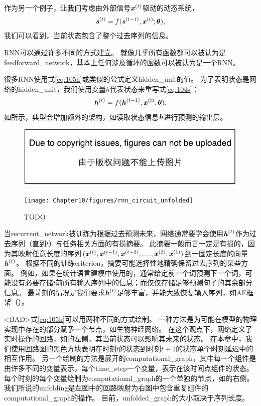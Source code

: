 
作为另一个例子，让我们考虑由外部信号$\boldsymbol{\mathit{x}}^{(t)}$驱动的动态系统，
\begin{align}
 \label{eq:104s}
 \boldsymbol{\mathit{s}}^{(t)} = f(\boldsymbol{\mathit{s}}^{(t-1)}, \boldsymbol{\mathit{x}}^{(t)} ; \boldsymbol{\theta}),
\end{align}
我们可以看到，当前状态包含了整个过去序列的信息。

\gls{RNN}可以通过许多不同的方式建立。
就像几乎所有函数都可以被认为是\gls{feedforward_network}，基本上任何涉及循环的函数可以被认为是一个\gls{RNN}。

很多\gls{RNN}使用式\eqref{eq:105h}或类似的公式定义\gls{hidden_unit}的值。
为了表明状态是网络的\gls{hidden_unit}，我们使用变量$h$代表状态来重写式\eqref{eq:104s}：
\begin{align}
 \label{eq:105h}
 \boldsymbol{\mathit{h}}^{(t)} = f(\boldsymbol{\mathit{h}}^{(t-1)}, \boldsymbol{\mathit{x}}^{(t)} ; \boldsymbol{\theta}),
\end{align}
如所示，典型会增加额外的架构，如读取状态信息$\boldsymbol{\mathit{h}}$进行预测的输出层。
\begin{figure}[!htb]
\ifOpenSource
\centerline{\includegraphics{figure.pdf}}
\else
\centerline{\texttt{[image: Chapter10/figures/rnn\_circuit\_unfolded]}}
\fi
\caption{TODO}
\label{fig:chap10_rnn_circuit_unfolded}
\end{figure}

当\gls{recurrent_network}被训练为根据过去预测未来，网络通常要学会使用$\boldsymbol{\mathit{h}}^{(t)}$作为过去序列（直到$t$）与任务相关方面的有损摘要。
此摘要一般而言一定是有损的，因为其映射任意长度的序列$(\boldsymbol{\mathit{x}}^{(t)},\boldsymbol{\mathit{x}}^{(t-1)}, \boldsymbol{\mathit{x}}^{(t-2)},\dots,\boldsymbol{\mathit{x}}^{(2)}, \boldsymbol{\mathit{x}}^{(1)})$到一固定长度的向量$\boldsymbol{\mathit{h}}^{(t)}$。
根据不同的训练\gls{criterion}，摘要可能选择性地精确保留过去序列的某些方面。
例如，如果在统计语言建模中使用的，通常给定前一个词预测下一个词，可能没有必要存储$t$前所有输入序列中的信息；而仅仅存储足够预测句子的其余部分信息。
最苛刻的情况是我们要求$\boldsymbol{\mathit{h}}^{(t)}$足够丰富，并能大致恢复输入序列，如\gls{AE}框架（）。


<BAD>式\eqref{eq:105h}可以用两种不同的方式绘制。
一种方法是为可能在模型的物理实现中存在的部分赋予一个节点，如生物神经网络。
在这个观点下，网络定义了实时操作的回路，如的左侧，其当前状态可以影响其未来的状态。
在本章中，我们使用回路图的黑色方块表明在时刻$t$的状态到时刻$t+1$的状态单个时刻延迟中的相互作用。
另一个绘制的方法是展开的\gls{computational_graph}，其中每一个组件是由许多不同的变量表示，每个\gls{time_step}一个变量，表示在该时间点组件的状态。
每个时刻的每个变量绘制为\gls{computational_graph}的一个单独的节点，如的右侧。
我们所说的\gls{unfolding}是左图中的回路映射为右图中包含重复组件的\gls{computational_graph}的操作。
目前，\gls{unfolded_graph}的大小取决于序列长度。

